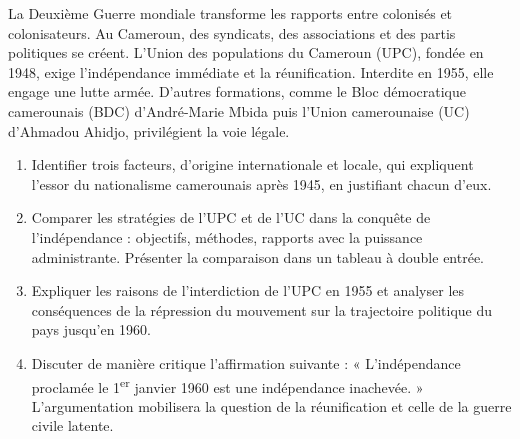 \documentclass[11pt]{article}
\begin{document}
\begin{exercice}
La Deuxième Guerre mondiale transforme les rapports entre colonisés et colonisateurs. Au Cameroun, des syndicats, des associations et des partis politiques se créent. L'Union des populations du Cameroun (UPC), fondée en 1948, exige l'indépendance immédiate et la réunification. Interdite en 1955, elle engage une lutte armée. D'autres formations, comme le Bloc démocratique camerounais (BDC) d'André-Marie Mbida puis l'Union camerounaise (UC) d'Ahmadou Ahidjo, privilégient la voie légale.
\begin{enumerate}
\item Identifier trois facteurs, d'origine internationale et locale, qui expliquent l'essor du nationalisme camerounais après 1945, en justifiant chacun d'eux.
\item Comparer les stratégies de l'UPC et de l'UC dans la conquête de l'indépendance : objectifs, méthodes, rapports avec la puissance administrante. Présenter la comparaison dans un tableau à double entrée.
\item Expliquer les raisons de l'interdiction de l'UPC en 1955 et analyser les conséquences de la répression du mouvement sur la trajectoire politique du pays jusqu'en 1960.
\item Discuter de manière critique l'affirmation suivante : « L'indépendance proclamée le 1\textsuperscript{er} janvier 1960 est une indépendance inachevée. » L'argumentation mobilisera la question de la réunification et celle de la guerre civile latente.
\end{enumerate}
\end{exercice}
\end{document}
